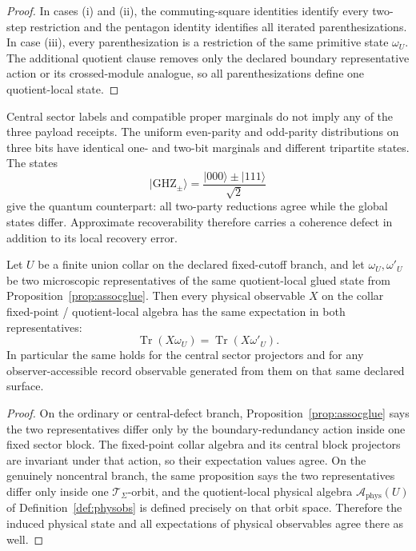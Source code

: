 \begin{proof}
In cases \textup{(i)} and \textup{(ii)}, the commuting-square identities identify every two-step
restriction and the pentagon identity identifies all iterated parenthesizations. In case
\textup{(iii)}, every parenthesization is a restriction of the same primitive state
\(\omega_U\). The additional quotient clause removes only the declared boundary representative
action or its crossed-module analogue, so all parenthesizations define one quotient-local state.
\end{proof}

\begin{remark}
Central sector labels and compatible proper marginals do not imply any of the three payload
receipts. The uniform even-parity and odd-parity distributions on three bits have identical one-
and two-bit marginals and different tripartite states. The states
\[
|\mathrm{GHZ}_{\pm}\rangle
=
\frac{|000\rangle\pm|111\rangle}{\sqrt2}
\]
give the quantum counterpart: all two-party reductions agree while the global states differ.
Approximate recoverability therefore carries a coherence defect in addition to its local recovery
error.
\end{remark}

\begin{corollary}\label{cor:obsglue}
Let \(U\) be a finite union collar on the declared fixed-cutoff branch, and let
\(\omega_U,\omega'_U\) be two microscopic representatives of the same quotient-local glued state
from Proposition~\ref{prop:assocglue}. Then every physical observable \(X\) on the collar
fixed-point / quotient-local algebra has the same expectation in both representatives:
\[
\operatorname{Tr}(X\omega_U)=\operatorname{Tr}(X\omega'_U).
\]
In particular the same holds for the central sector projectors and for any observer-accessible
record observable generated from them on that same declared surface.
\end{corollary}

\begin{proof}
On the ordinary or central-defect branch, Proposition~\ref{prop:assocglue} says the two
representatives differ only by the boundary-redundancy action inside one fixed sector block. The
fixed-point collar algebra and its central block projectors are invariant under that action, so
their expectation values agree. On the genuinely noncentral branch, the same proposition says the
two representatives differ only inside one \(\mathcal T_\Sigma\)-orbit, and the quotient-local
physical algebra \(\mathcal A_{\mathrm{phys}}(U)\) of Definition~\ref{def:physobs} is defined
precisely on that orbit space. Therefore the induced physical state and all expectations of
physical observables agree there as well.
\end{proof}
